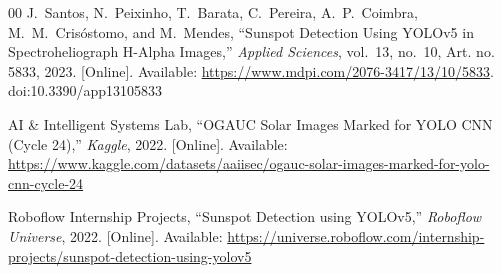 \documentclass[journal]{IEEEtran}
\begin{document}
\begin{thebibliography}{00}
    J.~Santos, N.~Peixinho, T.~Barata, C.~Pereira, A.~P.~Coimbra, M.~M.~Crisóstomo, and M.~Mendes, ``Sunspot Detection Using YOLOv5 in Spectroheliograph H-Alpha Images,'' \emph{Applied Sciences}, vol.~13, no.~10, Art.
no. 5833, 2023. [Online]. Available: \url{https://www.mdpi.com/2076-3417/13/10/5833}. doi:10.3390/app13105833

    AI \& Intelligent Systems Lab, ``OGAUC Solar Images Marked for YOLO CNN (Cycle 24),'' \textit{Kaggle}, 2022. [Online]. Available: \url{https://www.kaggle.com/datasets/aaiisec/ogauc-solar-images-marked-for-yolo-cnn-cycle-24}

    Roboflow Internship Projects, ``Sunspot Detection using YOLOv5,'' \textit{Roboflow Universe}, 2022. [Online]. Available: \url{https://universe.roboflow.com/internship-projects/sunspot-detection-using-yolov5}

\end{thebibliography}
\end{document}
